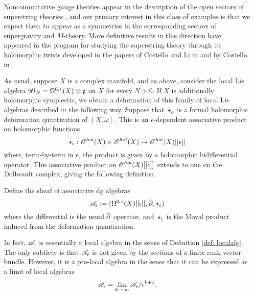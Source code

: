 Noncommutative gauge theories appear in the description of the open sectors of superstring theories \cite{WittenNonComm}, and our primary interest in this class of examples is that we expect them to appear as a symmetries in the corresponding sectors of supergravity and $M$-theory. 
More definitive results in this direction have appeared in the program for studying the superstring theory through its holomorphic twists developed in the papers of Costello and Li in \cite{CostelloLiSUGRA} and by Costello in \cite{MTheory1, MTheory2}. 

As usual, suppose $X$ is a complex manifold, and as above, consider the local Lie algebra $\mathscr G l_N = \Omega^{0,*}(X) \otimes \mathfrak g$ on $X$ for every $N > 0$. 
If $X$ is additionally holomorphic symplectic, we obtain a deformation of this family of local Lie algebras described in the following way. 
Suppose that $\star_\epsilon$ is a formal holomorphic deformation quantization of $(X,\omega)$. 
This is an $\epsilon$-dependent associative product on holomorphic functions 
\[
\star_\epsilon : \mathscr O^{hol}(X) \times \mathscr O^{hol}(X) \to \mathscr O^{hol}(X)[[\epsilon]]
\]
where, term-by-term in $\epsilon$, the product is given by a holomorphic bidifferential operator. 
This associative product on $\mathscr O^{hol}(X)[[\epsilon]]$ extends to one on the Dolbeault complex, giving the following definition. 

\begin{dfn}
Define the sheaf of associative dg algebras
\[
\mathscr A_\epsilon := (\Omega^{0,*}(X)[[\epsilon]], \overline{\partial}, \star_{\epsilon})
\]
where the differential is the usual $\overline{\partial}$ operator, and $\star_{\epsilon}$ is the Moyal product induced from the deformation quantization.
\end{dfn}

In fact, $\mathscr A_\epsilon$ is essentially a local algebra in the sense of Definition \ref{def: localalg}. 
The only subtlety is that $\mathscr A_\epsilon$ is not given by the sections of a finite rank vector bundle.
However, it is a pro-local algebra in the sense that it can be expressed as a limit of local algebras
\[
\mathscr A_\epsilon = \lim_{k \to \infty} \mathscr A_\epsilon / \epsilon^{k+1} .
\] 

